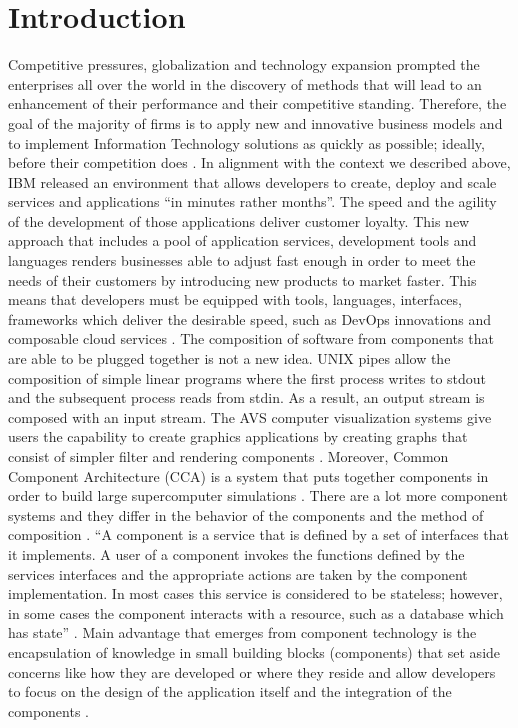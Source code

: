 \chapter{Introduction}

Competitive pressures, globalization and technology expansion prompted the enterprises all over the world in the discovery of methods that will lead to an enhancement of their performance and their competitive standing. Therefore, the goal of the majority of firms is to apply new and innovative business models and to implement Information Technology solutions as quickly as possible; ideally, before their competition does \cite{Chesbrough:2002, Kumar:2004}. 
In alignment with the context we described above, IBM released an environment that allows developers to create, deploy and scale services and applications “in minutes rather months”. The speed and the agility of the development of those applications deliver customer loyalty. This new approach that includes a pool of application services, development tools and languages renders businesses able to adjust fast enough in order to meet the needs of their customers by introducing new products to market faster. This means that developers must be equipped with tools, languages, interfaces, frameworks which deliver the desirable speed, such as DevOps innovations and composable cloud services \citep{IBMRedBookBlueMix:2014}. 
The composition of software from components that are able to be plugged together is not a new idea. UNIX pipes allow the composition of simple linear programs where the first process writes to stdout and the subsequent process reads from stdin. As a result, an output stream is composed with an input stream. The AVS computer visualization systems give users the capability to create graphics applications by creating graphs that consist of simpler filter and rendering components \citep{Curington:1991}. Moreover, Common Component Architecture (CCA) is a system that puts together components in order to build large supercomputer simulations \citep{Armstrong:1999}. There are a lot more component systems and they differ in the behavior of the components and the method of composition \citep{Gannon:2004}. 
“A component is a service that is defined by a set of interfaces that it implements. A user of a component invokes the functions defined by the services interfaces and the appropriate actions are taken by the component implementation. In most cases this service is considered to be stateless; however, in some cases the component interacts with a resource, such as a database which has state” \citep{Gannon:2004b}. Main advantage that emerges from component technology is the encapsulation of knowledge in small building blocks (components) that set aside concerns like how they are developed or where they reside and allow developers to focus on the design of the application itself and the integration of the components \citep{Malony:2005}. 

